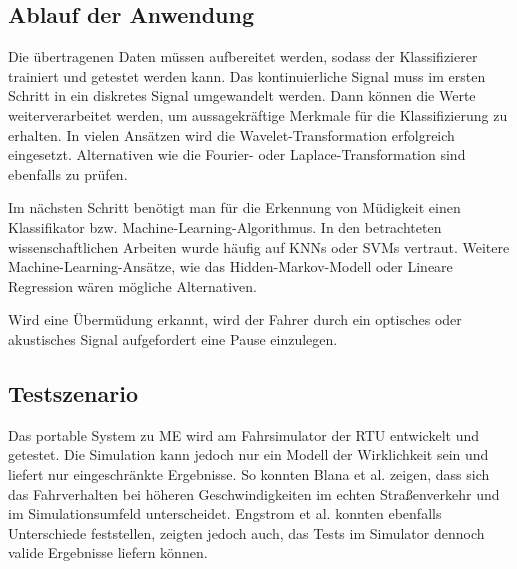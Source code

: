 {\subsection{Ablauf der Anwendung}
Die übertragenen Daten müssen aufbereitet werden, sodass der Klassifizierer trainiert und getestet werden kann. Das kontinuierliche Signal muss im ersten Schritt in ein diskretes Signal umgewandelt werden. Dann können die Werte weiterverarbeitet werden, um aussagekräftige Merkmale für die Klassifizierung zu erhalten. In vielen Ansätzen wird die Wavelet-Transformation  \cite{Chui:1992:IW:163196} erfolgreich eingesetzt. Alternativen wie die Fourier- \cite{Bochner_1} oder Laplace-Transformation \cite{Widder_1} sind ebenfalls zu prüfen.

Im nächsten Schritt benötigt man für die Erkennung von Müdigkeit einen Klassifikator bzw. Machine-Learning-Algorithmus. In den betrachteten wissenschaftlichen Arbeiten wurde häufig auf KNNs \cite{ann} oder SVMs \cite{svm} vertraut. Weitere Machine-Learning-Ansätze, wie das Hidden-Markov-Modell oder Lineare Regression wären mögliche Alternativen.

Wird eine Übermüdung erkannt, wird der Fahrer durch ein optisches oder akustisches Signal aufgefordert eine Pause einzulegen.

\subsection{Testszenario}
\label{sec:scene}
Das portable System zu \acl{ME} wird am Fahrsimulator der \acl{RTU} entwickelt und getestet. Die Simulation kann jedoch nur ein Modell der Wirklichkeit sein und liefert nur eingeschränkte Ergebnisse. So konnten Blana et al. \cite{Blana_1} zeigen, dass sich das Fahrverhalten bei höheren Geschwindigkeiten im echten Straßenverkehr und im Simulationsumfeld unterscheidet. Engstrom et al.  \cite{Engstrom_2322937} konnten ebenfalls Unterschiede feststellen, zeigten jedoch auch, das Tests im Simulator dennoch valide Ergebnisse liefern können. \\

}
